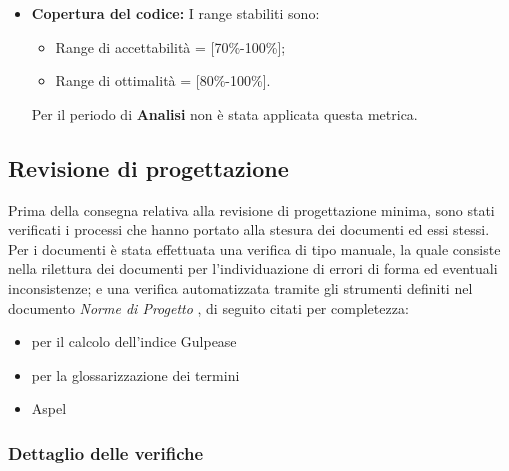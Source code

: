 \begin{itemize}
\item \textbf{Copertura del codice: }I range stabiliti sono:
      \begin{itemize}
        \item Range di accettabilità = [70\%-100\%];
        \item Range di ottimalità = [80\%-100\%].
      \end{itemize}
Per il periodo di \textbf{Analisi} non è stata applicata questa metrica.
\end{itemize}



  \subsection{Revisione di progettazione}
  Prima della consegna relativa alla revisione di progettazione minima, sono stati verificati i processi che hanno portato alla stesura dei documenti ed essi stessi. \\
  Per i documenti è stata effettuata una verifica di tipo manuale, la quale consiste nella rilettura dei documenti per l'individuazione di errori di forma ed eventuali inconsistenze;
  e una verifica automatizzata tramite gli strumenti definiti nel documento \emph{Norme di Progetto \VersioneNP{}}, di seguito citati per completezza:
  \begin{itemize}
    \item {}  per il calcolo dell’indice Gulpease
    \item {}  per la glossarizzazione dei termini
    \item Aspel
  \end{itemize}
  \subsubsection{Dettaglio delle verifiche}
